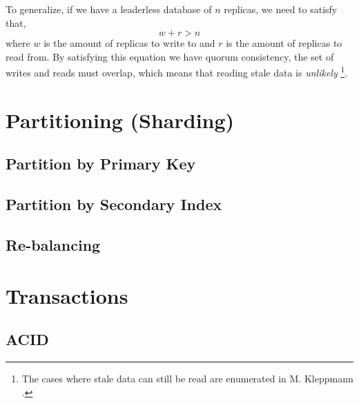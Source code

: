 To generalize, if we have a leaderless database of $n$ replicas,
we need to satisfy that,
$$
w + r > n
$$
where $w$ is the amount of replicas to write to and $r$ is the amount of replicas to read from.
By satisfying this equation we have quorum consistency,
the set of writes and reads must overlap,
which means that reading stale data is \textsl{unlikely}%
\footnote{The cases where stale data can still be read are enumerated in M. Kleppmann \cite{data-intensive}.}.

\section{Partitioning (Sharding)}

\subsection{Partition by Primary Key}

\subsection{Partition by Secondary Index}

\subsection{Re-balancing}

\section{Transactions}

\subsection{ACID}
